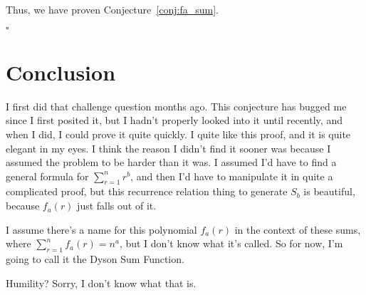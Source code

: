 \documentclass[a4paper]{article}
\newcommand{\sn}{\sum\limits_{r=1}^{n}}
\begin{document}
Thus, we have proven Conjecture~\ref{conj:fa_sum}.

\hspace*{\fill}$\square$

\section{Conclusion}

I first did that challenge question months ago. This conjecture has bugged me since I first posited it, but I hadn't properly looked into it until recently, and when I did, I could prove it quite quickly. I quite like this proof, and it is quite elegant in my eyes. I think the reason I didn't find it sooner was because I assumed the problem to be harder than it was. I assumed I'd have to find a general formula for $\sn r^b$, and then I'd have to manipulate it in quite a complicated proof, but this recurrence relation thing to generate $S_b$ is beautiful, because $f_a(r)$ just falls out of it.

I assume there's a name for this polynomial $f_a(r)$ in the context of these sums, where $\sn f_a(r) = n^a$, but I don't know what it's called. So for now, I'm going to call it the Dyson Sum Function.

Humility? Sorry, I don't know what that is.

\printbibliography
\end{document}
